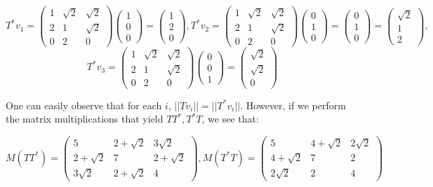 \begin{solution}
    $$T^*v_1 =\begin{pmatrix} 1 & \sqrt{2} & \sqrt{2} \\ 2 & 1 & \sqrt{2} \\ 0 & 2 & 0 \end{pmatrix} \begin{pmatrix} 1 \\ 0 \\ 0 \end{pmatrix} = \begin{pmatrix} 1 \\ 2 \\ 0 \end{pmatrix}, 
    T^*v_2 = \begin{pmatrix} 1 & \sqrt{2} & \sqrt{2} \\ 2 & 1 & \sqrt{2} \\ 0 & 2 & 0 \end{pmatrix} \begin{pmatrix} 0 \\ 1 \\ 0 \end{pmatrix} = \begin{pmatrix} 0 \\ 1 \\ 0 \end{pmatrix} = \begin{pmatrix} \sqrt{2} \\ 1 \\ 2 \end{pmatrix},$$
    $$T^*v_3 =\begin{pmatrix} 1 & \sqrt{2} & \sqrt{2} \\ 2 & 1 & \sqrt{2} \\ 0 & 2 & 0 \end{pmatrix} \begin{pmatrix} 0 \\ 0 \\ 1 \end{pmatrix} = \begin{pmatrix} \sqrt{2} \\ \sqrt{2} \\ 0 \end{pmatrix}$$

    One can easily observe that for each $i$, $\lvert \lvert Tv_i \rvert \rvert = \lvert \lvert T^*v_i \rvert \rvert$. However, if we perform the matrix multiplications that yield $TT^*, T^*T$, we see that:

    $$M(TT^*) = \begin{pmatrix} 5 & 2 + \sqrt{2} & 3\sqrt{2} \\ 2 + \sqrt{2} & 7 & 2 + \sqrt{2} \\ 3\sqrt{2} & 2 + \sqrt{2} & 4 \end{pmatrix},
    M(T^*T) = \begin{pmatrix} 5 & 4 + \sqrt{2} & 2\sqrt{2} \\ 4 + \sqrt{2} & 7 & 2 \\ 2\sqrt{2} & 2 & 4 \end{pmatrix}$$


\end{solution}
